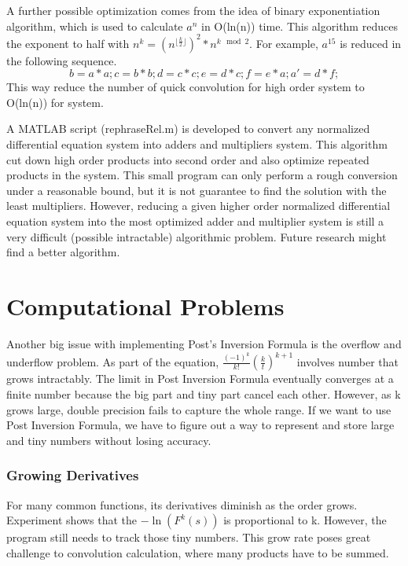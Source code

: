\documentclass[12pt]{article}
\begin{document}
A further possible optimization comes from the idea of binary exponentiation algorithm, which is used to calculate $a^{n}$ in O(ln(n)) time. This algorithm reduces the exponent to half with $n^{k} = (n^{\lfloor \frac{k}{2} \rfloor})^{2} * n^{k\mod2} $. For example, $a^{15}$ is reduced in the following sequence.
\begin{equation}
b = a * a;
c = b * b;
d = c * c;
e = d * c;
f = e * a;
a' = d * f;
\end{equation}
This way reduce the number of quick convolution for high order system to O(ln(n)) for system.

A MATLAB script (rephraseRel.m) is developed to convert any normalized differential equation system into adders and multipliers system. This algorithm cut down high order products into second order and also optimize repeated products in the system.
This small program can only perform a rough conversion under a reasonable bound, but it is not guarantee to find the solution with the least multipliers. However, reducing a given higher order normalized differential equation system into the most optimized adder and multiplier system is still a very difficult (possible intractable) algorithmic problem. Future research might find a better algorithm.


\section{Computational Problems}
Another big issue with implementing Post's Inversion Formula is the overflow and underflow problem. As part of the equation, $\frac{(-1)^{k}}{k!} (\frac{k}{t})^{k+1}$ involves number that grows intractably. The limit in Post Inversion Formula eventually converges at a finite number because the big part and tiny part cancel each other. However, as k grows large, double precision fails to capture the whole range. 
If we want to use Post Inversion Formula, we have to figure out a way to represent and store large and tiny numbers without losing accuracy.

\subsubsection{Growing Derivatives}
For many common functions, its derivatives diminish as the order grows. 
Experiment shows that the $-\ln(F^{k}(s))$ is proportional to k. However, the program still needs to track those tiny numbers. This grow rate poses great challenge to convolution calculation, where many products have to be summed.
\end{document}

